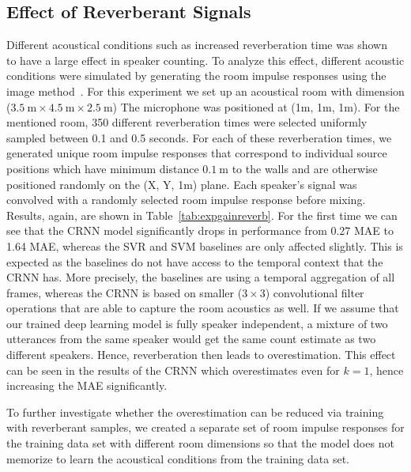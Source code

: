 \subsection{Effect of Reverberant Signals}%
\label{ssec:exp_reverb}
Different acoustical conditions such as increased reverberation time was shown~\cite{Pasha17_reverb} to have a large effect in speaker counting.
To analyze this effect, different acoustic conditions were simulated by generating the room impulse responses using the image method~\cite{Allen79, Habets16}.
For this experiment we set up an acoustical room with dimension ($3.5~\mbox{m} \times 4.5~\mbox{m} \times 2.5~\mbox{m}$)
The microphone was positioned at (1m, 1m, 1m).
For the mentioned room, 350 different reverberation times were selected uniformly sampled between 0.1 and 0.5 seconds.
For each of these reverberation times, we generated unique room impulse responses that correspond to individual source positions which have minimum distance $0.1~\mbox{m}$ to the walls and are otherwise positioned randomly on the (X, Y, 1m) plane.
Each speaker's signal was convolved with a randomly selected room impulse response before mixing.
Results, again, are shown in Table~\ref{tab:expgainreverb}.
For the first time we can see that the CRNN model significantly drops in performance from 0.27 MAE to 1.64 MAE, whereas the SVR and SVM baselines are only affected slightly.
This is expected as the baselines do not have access to the temporal context that the CRNN has.
More precisely, the baselines are using a temporal aggregation of all frames, whereas the CRNN is based on smaller (\(3 \times 3\)) convolutional filter operations that are able to capture the room acoustics as well.
If we assume that our trained deep learning model is fully speaker independent, a mixture of two utterances from the same speaker would get the same count estimate as two different speakers.
Hence, reverberation then leads to overestimation.
This effect can be seen in the results of the CRNN which overestimates even for \(k = 1\), hence increasing the MAE significantly.
\par
To further investigate whether the overestimation can be reduced via training with reverberant samples, we created a separate set of room impulse responses for the training data set with different room dimensions so that the model does not memorize to learn the acoustical conditions from the training data set.

